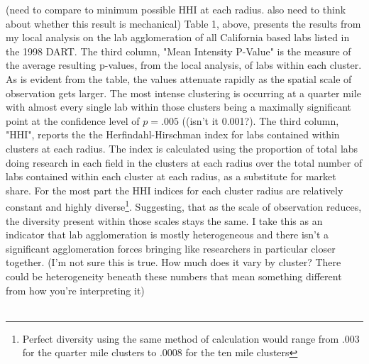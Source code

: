 \documentclass[12pt,letterpaper]{article}
\begin{document}
{\color{red}(need to compare to minimum possible HHI at each radius. also need to think about whether this result is mechanical)}
Table 1, above,  presents the results from my local analysis on the lab agglomeration of all California based labs listed in the 1998 DART. The third column, "Mean Intensity P-Value" is the measure of the average resulting p-values, from the local analysis, of labs within each cluster. As is evident from the table, the values attenuate rapidly as the spatial scale of observation gets larger. The most intense clustering is occurring at a quarter mile with almost every single lab within those clusters being a maximally significant point at the confidence level of \(p=.005\) ({\color{red}(isn't it 0.001?)}. The third column, "HHI", reports the the Herfindahl-Hirschman index for labs contained within clusters at each radius. The index is calculated using the proportion of total labs doing research in each field in the clusters at each radius over the total number of labs contained within each cluster at each radius, as a substitute for market share. For the most part the HHI indices for each cluster radius are relatively constant and highly diverse\footnote{Perfect diversity using the same method of calculation would range from .003 for the quarter mile clusters to .0008 for the ten mile clusters}. Suggesting, that as the scale of observation reduces, the diversity present within those scales stays the same. I take this as an indicator that lab agglomeration is mostly heterogeneous and there isn't a significant agglomeration forces bringing like researchers in particular closer together. {\color{blue}(I'm not sure this is true. How much does it vary by cluster? There could be heterogeneity beneath these numbers that mean something different from how you're interpreting it)}
\\
\\
\end{document}
